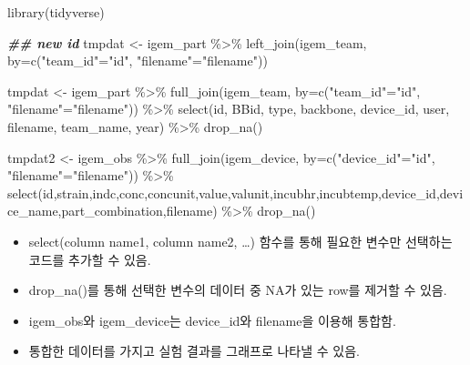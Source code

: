 \documentclass[
]{article}
\newenvironment{Shaded}{\begin{snugshade}}{\end{snugshade}}
\newcommand{\AttributeTok}[1]{\textcolor[rgb]{0.77,0.63,0.00}{#1}}
\newcommand{\DocumentationTok}[1]{\textcolor[rgb]{0.56,0.35,0.01}{\textbf{\textit{#1}}}}
\newcommand{\FunctionTok}[1]{\textcolor[rgb]{0.00,0.00,0.00}{#1}}
\newcommand{\NormalTok}[1]{#1}
\newcommand{\OtherTok}[1]{\textcolor[rgb]{0.56,0.35,0.01}{#1}}
\newcommand{\SpecialCharTok}[1]{\textcolor[rgb]{0.00,0.00,0.00}{#1}}
\newcommand{\StringTok}[1]{\textcolor[rgb]{0.31,0.60,0.02}{#1}}
\begin{document}
\begin{Shaded}
\begin{Highlighting}[]
\FunctionTok{library}\NormalTok{(tidyverse)}

\DocumentationTok{\#\# new id }
\NormalTok{tmpdat }\OtherTok{\textless{}{-}}\NormalTok{ igem\_part }\SpecialCharTok{\%\textgreater{}\%} 
  \FunctionTok{left\_join}\NormalTok{(igem\_team, }\AttributeTok{by=}\FunctionTok{c}\NormalTok{(}\StringTok{"team\_id"}\OtherTok{=}\StringTok{"id"}\NormalTok{, }\StringTok{"filename"}\OtherTok{=}\StringTok{"filename"}\NormalTok{))}

\NormalTok{tmpdat }\OtherTok{\textless{}{-}}\NormalTok{ igem\_part }\SpecialCharTok{\%\textgreater{}\%} 
  \FunctionTok{full\_join}\NormalTok{(igem\_team, }\AttributeTok{by=}\FunctionTok{c}\NormalTok{(}\StringTok{"team\_id"}\OtherTok{=}\StringTok{"id"}\NormalTok{, }\StringTok{"filename"}\OtherTok{=}\StringTok{"filename"}\NormalTok{)) }\SpecialCharTok{\%\textgreater{}\%} 
  \FunctionTok{select}\NormalTok{(id, BBid, type, backbone, device\_id, user, filename, team\_name, year) }\SpecialCharTok{\%\textgreater{}\%} 
  \FunctionTok{drop\_na}\NormalTok{()}

\NormalTok{tmpdat2 }\OtherTok{\textless{}{-}}\NormalTok{ igem\_obs }\SpecialCharTok{\%\textgreater{}\%}
  \FunctionTok{full\_join}\NormalTok{(igem\_device, }\AttributeTok{by=}\FunctionTok{c}\NormalTok{(}\StringTok{"device\_id"}\OtherTok{=}\StringTok{"id"}\NormalTok{, }\StringTok{"filename"}\OtherTok{=}\StringTok{"filename"}\NormalTok{)) }\SpecialCharTok{\%\textgreater{}\%}
  \FunctionTok{select}\NormalTok{(id,strain,indc,conc,concunit,value,valunit,incubhr,incubtemp,device\_id,device\_name,part\_combination,filename) }\SpecialCharTok{\%\textgreater{}\%}
  \FunctionTok{drop\_na}\NormalTok{()}
\end{Highlighting}
\end{Shaded}

\begin{itemize}
\item
  select(column name1, column name2, \ldots) 함수를 통해 필요한 변수만
  선택하는 코드를 추가할 수 있음.
\item
  drop\_na()를 통해 선택한 변수의 데이터 중 NA가 있는 row를 제거할 수
  있음.
\item
  igem\_obs와 igem\_device는 device\_id와 filename을 이용해 통합함.
\item
  통합한 데이터를 가지고 실험 결과를 그래프로 나타낼 수 있음.
\end{itemize}
\end{document}
